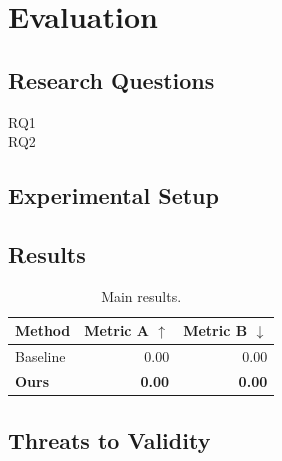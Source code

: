 \chapter{Evaluation}\label{ch:evaluation}

\section{Research Questions}\label{sec:rqs}
\begin{description}
  \item[RQ1] 
  \item[RQ2] 
\end{description}

\section{Experimental Setup}\label{sec:setup}

\section{Results}\label{sec:results}
\begin{table}[htbp]
  \centering
  \caption{Main results. }
  \label{tab:main-results}
  \begin{tabular}{lrr}
    \toprule
    Method & Metric A $\uparrow$ & Metric B $\downarrow$ \\
    \midrule
    Baseline       & 0.00 & 0.00 \\
    \textbf{Ours}  & \textbf{0.00} & \textbf{0.00} \\
    \bottomrule
  \end{tabular}
\end{table}

\section{Threats to Validity}\label{sec:threats}
